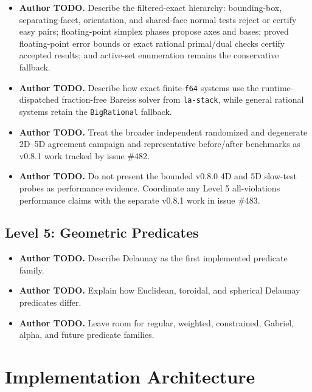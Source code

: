 \documentclass[manuscript,nonacm]{acmart}
\newcommand{\AuthorTodo}[1]{\textbf{Author TODO.} #1}
\begin{document}
\begin{itemize}
{    checks.}
  \item \AuthorTodo{Describe the filtered-exact hierarchy: bounding-box,
      separating-facet, orientation, and shared-face normal tests reject or
      certify easy pairs; floating-point simplex phases propose axes and bases;
      proved floating-point error bounds or exact rational primal/dual checks
      certify accepted results; and active-set enumeration remains the
    conservative fallback.}
  \item \AuthorTodo{Describe how exact finite-\texttt{f64} systems use the
      runtime-dispatched fraction-free Bareiss solver from \texttt{la-stack},
    while general rational systems retain the \texttt{BigRational} fallback.}
  \item \AuthorTodo{Treat the broader independent randomized and degenerate
      2D--5D agreement campaign and representative before/after benchmarks as
    v0.8.1 work tracked by issue \#482.}
  \item \AuthorTodo{Do not present the bounded v0.8.0 4D and 5D slow-test probes
      as performance evidence. Coordinate any Level 5 all-violations performance
    claims with the separate v0.8.1 work in issue \#483.}
\end{itemize}

\subsection{Level 5: Geometric Predicates}

\begin{itemize}
  \item \AuthorTodo{Describe Delaunay as the first implemented predicate
    family.}
  \item \AuthorTodo{Explain how Euclidean, toroidal, and spherical Delaunay
    predicates differ.}
  \item \AuthorTodo{Leave room for regular, weighted, constrained, Gabriel,
    alpha, and future predicate families.}
\end{itemize}

\section{Implementation Architecture}
\end{document}

